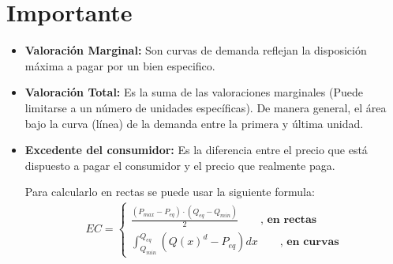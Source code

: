 \documentclass{templateNote}
\begin{document}
\portada
\margenes %

\section{Importante}
\begin{itemize}
    \item \textbf{Valoración Marginal:} Son curvas de demanda reflejan la disposición máxima a pagar por un bien especifico.

    \item \textbf{Valoración Total:} Es la suma de las valoraciones marginales (Puede limitarse a un número de
    unidades específicas). De manera general, el área bajo la curva (línea) de la demanda entre la
    primera y última unidad.
    \item \textbf{Excedente del consumidor:} Es la diferencia entre el precio que está dispuesto a pagar el consumidor y el precio que realmente paga.
    
    Para calcularlo en rectas se puede usar la siguiente formula:
    \begin{align*}
        EC = \begin{cases}
                \displaystyle \frac{(P_{max} - P_{eq}) \cdot (Q_{eq} - Q_{min})}{2} \qquad \textbf{, en rectas}\\
                \displaystyle \int_{Q_{min}}^{Q_{eq}}{(Q(x)^{d} - P_{eq})dx} \qquad \textbf{, en curvas}
            \end{cases}
    \end{align*}
    \begin{figure}[H]
        \centering
\end{figure}
\end{itemize}
\end{document}
